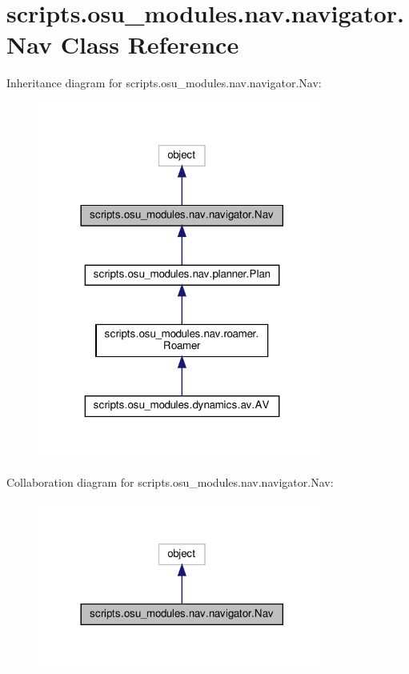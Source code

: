 \hypertarget{classscripts_1_1osu__modules_1_1nav_1_1navigator_1_1Nav}{}\section{scripts.\+osu\+\_\+modules.\+nav.\+navigator.\+Nav Class Reference}
\label{classscripts_1_1osu__modules_1_1nav_1_1navigator_1_1Nav}


Inheritance diagram for scripts.\+osu\+\_\+modules.\+nav.\+navigator.\+Nav\+:
\nopagebreak
\begin{figure}[H]
\begin{center}
\leavevmode
\includegraphics[width=269pt]{d2/d48/classscripts_1_1osu__modules_1_1nav_1_1navigator_1_1Nav__inherit__graph}
\end{center}
\end{figure}


Collaboration diagram for scripts.\+osu\+\_\+modules.\+nav.\+navigator.\+Nav\+:
\nopagebreak
\begin{figure}[H]
\begin{center}
\leavevmode
\includegraphics[width=269pt]{d0/d22/classscripts_1_1osu__modules_1_1nav_1_1navigator_1_1Nav__coll__graph}
\end{center}
\end{figure}
